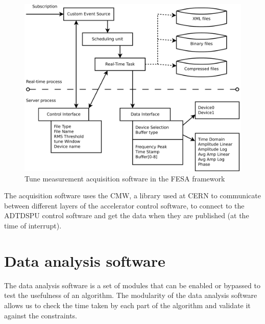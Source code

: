 \begin{figure}[H]
\caption{Tune measurement acquisition software in the FESA framework}
\centering
\includegraphics[scale=0.3]{tune_meas.pdf}
\end{figure}

The acquisition software uses the \gls{CMW}, a library used at \gls{CERN} to communicate between different layers of the accelerator control software, to connect to the \gls{ADTDSPU} control software and get the data when they are published (at the time of interrupt).

\section{Data analysis software}
\label{sec:data_analysis_software}

The data analysis software is a set of modules that can be enabled or bypassed to test the usefulness of an algorithm. The modularity of the data analysis software allows us to check the time taken by each part of the algorithm and validate it against the constraints.

